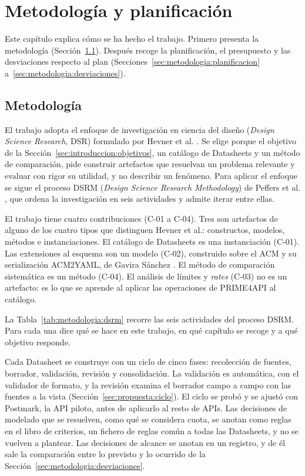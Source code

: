 
\chapter{Metodología y planificación}
\label{cap:metodologia}

Este capítulo explica cómo se ha hecho el trabajo. Primero presenta la metodología
(Sección~\ref{sec:metodologia:enfoque}). Después recoge la planificación,
el presupuesto y las desviaciones respecto al plan
(Secciones~\ref{sec:metodologia:planificacion}
a~\ref{sec:metodologia:desviaciones}).

\section{Metodología}
\label{sec:metodologia:enfoque}

El trabajo adopta el enfoque de investigación en ciencia del diseño
(\textit{Design Science Research}, DSR) formulado por Hevner et al.
\citep{hevner2004dsr}. Se elige porque el objetivo de la
Sección~\ref{sec:introduccion:objetivos}, un catálogo de Datasheets y un
método de comparación, pide construir artefactos que resuelvan un problema relevante y evaluar con rigor su utilidad, y no
describir un fenómeno. Para aplicar el enfoque se sigue el
proceso DSRM (\textit{Design Science Research Methodology}) de Peffers
et al. \citep{peffers2007dsrm}, que ordena la
investigación en seis actividades y admite iterar entre ellas.

El trabajo tiene cuatro contribuciones (C-01 a C-04). Tres son artefactos de alguno de los cuatro tipos que distinguen Hevner et al.: constructos, modelos, métodos e instanciaciones. El catálogo de Datasheets es una instanciación (C-01). Las extensiones al esquema son un modelo (C-02), construido sobre el ACM y su serialización ACM2YAML, de Gavira Sánchez \citep{gavira2026tfm}. El método de comparación sistemática es un método (C-04). El análisis de límites y \textit{rates} (C-03) no es un artefacto: es lo que se aprende al aplicar las operaciones de PRIME4API al catálogo.

La Tabla~\ref{tab:metodologia:dsrm} recorre las seis actividades del proceso DSRM. Para cada una dice qué se hace en este trabajo, en qué capítulo se recoge y a qué objetivo responde.

Cada Datasheet se construye con un ciclo de cinco fases: recolección de fuentes, borrador, validación, revisión y consolidación. La validación es automática, con el validador de formato, y la revisión examina el borrador campo a campo con las fuentes a la vista (Sección~\ref{sec:propuesta:ciclo}). El ciclo se probó y se ajustó con Postmark, la API piloto, antes de aplicarlo al resto de APIs. Las decisiones de modelado que se resuelven, como qué se considera cuota, se anotan como reglas en el libro de criterios, un fichero de reglas común a todas las Datasheets, y no se vuelven a plantear. Las decisiones de alcance se anotan en un registro, y de él sale la comparación entre lo previsto y lo ocurrido de la Sección~\ref{sec:metodologia:desviaciones}.

